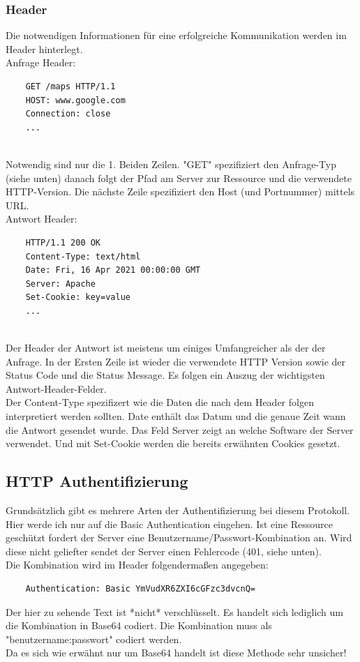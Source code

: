 \documentclass{article}
\begin{document}
\subsubsection{Header}
Die notwendigen Informationen für eine erfolgreiche Kommunikation werden im Header hinterlegt. \\
Anfrage Header:
\begin{verbatim}
    GET /maps HTTP/1.1
    HOST: www.google.com
    Connection: close
    ...
\end{verbatim}
\\
Notwendig sind nur die 1. Beiden Zeilen. "GET" spezifiziert den Anfrage-Typ (siehe unten) danach folgt der Pfad am Server zur Ressource und die verwendete HTTP-Version. 
Die nächste Zeile spezifiziert den Host (und Portnummer) mittels URL.\\
Antwort Header:
\begin{verbatim}
    HTTP/1.1 200 OK
    Content-Type: text/html
    Date: Fri, 16 Apr 2021 00:00:00 GMT
    Server: Apache
    Set-Cookie: key=value
    ...
\end{verbatim}
\\
Der Header der Antwort ist meistens um einiges Umfangreicher als der der Anfrage. In der Ersten Zeile ist wieder die verwendete HTTP Version sowie der Status Code und die Status Message. Es folgen ein Auszug der wichtigsten Antwort-Header-Felder. \\
Der Content-Type spezifizert wie die Daten die nach dem Header folgen interpretiert werden sollten. Date enthält das Datum und die genaue Zeit wann die Antwort gesendet wurde. Das Feld Server zeigt an welche Software der Server verwendet. Und mit Set-Cookie werden die bereits erwähnten Cookies gesetzt.

\subsection{HTTP Authentifizierung}
Grundsätzlich gibt es mehrere Arten der Authentifizierung bei diesem Protokoll. Hier werde ich nur auf die Basic Authentication eingehen. Ist eine Ressource geschützt fordert der Server eine Benutzername/Passwort-Kombination an. Wird diese nicht geliefter sendet der Server einen Fehlercode (401, siehe unten). \\
Die Kombination wird im Header folgendermaßen angegeben:
\begin{verbatim}
    Authentication: Basic YmVudXR6ZXI6cGFzc3dvcnQ=
\end{verbatim}
Der hier zu sehende Text ist *nicht* verschlüsselt. Es handelt sich lediglich um die Kombination in Base64 codiert. Die Kombination muss als "benutzername:passwort" codiert werden. \\
Da es sich wie erwähnt nur um Base64 handelt ist diese Methode sehr unsicher!
\end{document}
